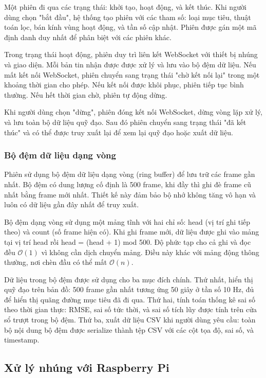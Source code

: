 \hspace{0.5cm} Một phiên đi qua các trạng thái: khởi tạo, hoạt động, và kết thúc. Khi người dùng chọn "bắt đầu", hệ thống tạo phiên với các tham số: loại mục tiêu, thuật toán lọc, bán kính vùng hoạt động, và tần số cập nhật. Phiên được gán một mã định danh duy nhất để phân biệt với các phiên khác.

Trong trạng thái hoạt động, phiên duy trì liên kết WebSocket với thiết bị nhúng và giao diện. Mỗi bản tin nhận được được xử lý và lưu vào bộ đệm dữ liệu. Nếu mất kết nối WebSocket, phiên chuyển sang trạng thái "chờ kết nối lại" trong một khoảng thời gian cho phép. Nếu kết nối được khôi phục, phiên tiếp tục bình thường. Nếu hết thời gian chờ, phiên tự động dừng.

Khi người dùng chọn "dừng", phiên đóng kết nối WebSocket, dừng vòng lặp xử lý, và lưu toàn bộ dữ liệu quỹ đạo. Sau đó phiên chuyển sang trạng thái "đã kết thúc" và có thể được truy xuất lại để xem lại quỹ đạo hoặc xuất dữ liệu.

\subsubsection{Bộ đệm dữ liệu dạng vòng}

\hspace{0.5cm} Phiên sử dụng bộ đệm dữ liệu dạng vòng (ring buffer) để lưu trữ các frame gần nhất. Bộ đệm có dung lượng cố định là 500 frame, khi đầy thì ghi đè frame cũ nhất bằng frame mới nhất. Thiết kế này đảm bảo bộ nhớ không tăng vô hạn và luôn có dữ liệu gần đây nhất để truy xuất.

Bộ đệm dạng vòng sử dụng một mảng tĩnh với hai chỉ số: head (vị trí ghi tiếp theo) và count (số frame hiện có). Khi ghi frame mới, dữ liệu được ghi vào mảng tại vị trí head rồi head = (head + 1) mod 500. Độ phức tạp cho cả ghi và đọc đều $\mathcal{O}(1)$ vì không cần dịch chuyển mảng. Điều này khác với mảng động thông thường, nơi chèn đầu có thể mất $\mathcal{O}(n)$.

Dữ liệu trong bộ đệm được sử dụng cho ba mục đích chính. Thứ nhất, hiển thị quỹ đạo trên bản đồ: 500 frame gần nhất tương ứng 50 giây ở tần số 10 Hz, đủ để hiển thị quãng đường mục tiêu đã đi qua. Thứ hai, tính toán thống kê sai số theo thời gian thực: RMSE, sai số tức thời, và sai số tích lũy được tính trên cửa sổ trượt trong bộ đệm. Thứ ba, xuất dữ liệu CSV khi người dùng yêu cầu: toàn bộ nội dung bộ đệm được serialize thành tệp CSV với các cột tọa độ, sai số, và timestamp.

\subsection{Xử lý nhúng với Raspberry Pi}

